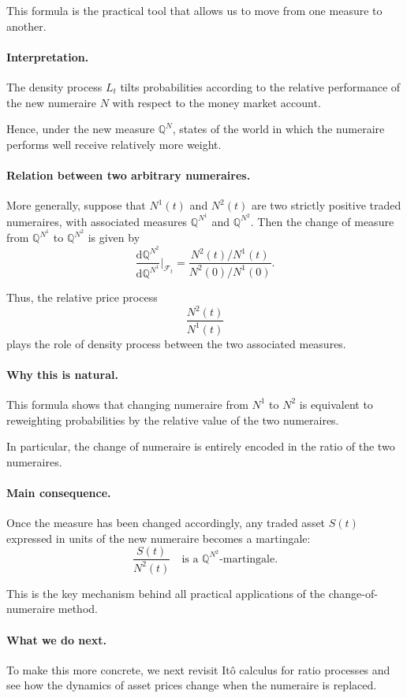 \documentclass[11pt]{article}
\newcommand{\Qbb}{\mathbb{Q}}
\theoremstyle{definition}
\theoremstyle{plain}
\begin{document}
This formula is the practical tool that allows us to move from one
measure to another.

\paragraph{Interpretation.}
The density process \(L_t\) tilts probabilities according to the
relative performance of the new numeraire \(N\) with respect to the
money market account.

Hence, under the new measure \(\Qbb^N\), states of the world in which
the numeraire performs well receive relatively more weight.

\paragraph{Relation between two arbitrary numeraires.}
More generally, suppose that \(N^1(t)\) and \(N^2(t)\) are two strictly
positive traded numeraires, with associated measures \(\Qbb^{N^1}\) and
\(\Qbb^{N^2}\).
Then the change of measure from \(\Qbb^{N^1}\) to \(\Qbb^{N^2}\) is given by
\[
\frac{\mathrm{d}\Qbb^{N^2}}{\mathrm{d}\Qbb^{N^1}}\Big|_{\mathcal{F}_t}
=
\frac{N^2(t)/N^1(t)}{N^2(0)/N^1(0)}.
\]

Thus, the relative price process
\[
\frac{N^2(t)}{N^1(t)}
\]
plays the role of density process between the two associated measures.

\paragraph{Why this is natural.}
This formula shows that changing numeraire from \(N^1\) to \(N^2\) is
equivalent to reweighting probabilities by the relative value of the two
numeraires.

In particular, the change of numeraire is entirely encoded in the ratio
of the two numeraires.

\paragraph{Main consequence.}
Once the measure has been changed accordingly, any traded asset \(S(t)\)
expressed in units of the new numeraire becomes a martingale:
\[
\frac{S(t)}{N^2(t)}
\quad\text{is a }\Qbb^{N^2}\text{-martingale.}
\]

This is the key mechanism behind all practical applications of the
change-of-numeraire method.

\paragraph{What we do next.}
To make this more concrete, we next revisit It\^o calculus for ratio
processes and see how the dynamics of asset prices change when the
numeraire is replaced.
\end{document}
